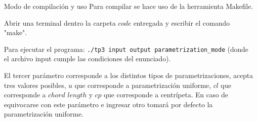 \begin{section}{Modo de compilación y uso}
	Para compilar se hace uso de la herramienta Makefile.
	
	Abrir una terminal dentro la carpeta $code$ entregada y escribir el comando "make".
	
	Para ejecutar el programa: \texttt{./tp3 input output parametrization\_mode} (donde el archivo input cumple las condiciones del enunciado). 
	
	El tercer parámetro corresponde a los distintos tipos de parametrizaciones, acepta tres valores posibles, $u$ que corresponde a parametrización uniforme, $cl$ que corresponde a $chord$ $length$ y $cp$ que corresponde a centrípeta. En caso de equivocarse con este parámetro e ingresar otro tomará por defecto la parametrización uniforme.
\end{section}